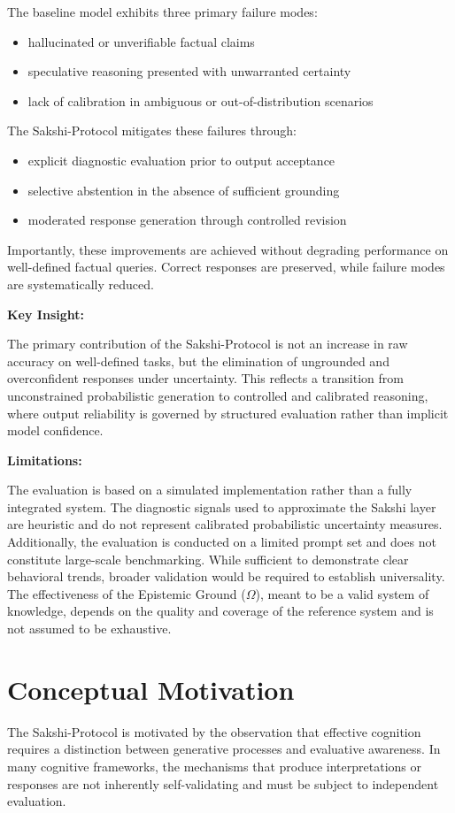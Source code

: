 \documentclass[12pt,a4paper]{article}
\begin{document}
The baseline model exhibits three primary failure modes:
\begin{itemize}
\item hallucinated or unverifiable factual claims
\item speculative reasoning presented with unwarranted certainty
\item lack of calibration in ambiguous or out-of-distribution scenarios
\end{itemize}

The Sakshi-Protocol mitigates these failures through:
\begin{itemize}
\item explicit diagnostic evaluation prior to output acceptance
\item selective abstention in the absence of sufficient grounding
\item moderated response generation through controlled revision
\end{itemize}

Importantly, these improvements are achieved without degrading performance on well-defined factual queries. Correct responses are preserved, while failure modes are systematically reduced.

\textbf{Key Insight:}

The primary contribution of the Sakshi-Protocol is not an increase in raw accuracy on well-defined tasks, but the elimination of ungrounded and overconfident responses under uncertainty. This reflects a transition from unconstrained probabilistic generation to controlled and calibrated reasoning, where output reliability is governed by structured evaluation rather than implicit model confidence.

\textbf{Limitations:}

The evaluation is based on a simulated implementation rather than a fully integrated system. The diagnostic signals used to approximate the Sakshi layer are heuristic and do not represent calibrated probabilistic uncertainty measures. Additionally, the evaluation is conducted on a limited prompt set and does not constitute large-scale benchmarking. While sufficient to demonstrate clear behavioral trends, broader validation would be required to establish universality. The effectiveness of the Epistemic Ground ($\Omega$), meant to be a valid system of knowledge, depends on the quality and coverage of the reference system and is not assumed to be exhaustive.

\section{Conceptual Motivation}
The Sakshi-Protocol is motivated by the observation that effective cognition requires a distinction between generative processes and evaluative awareness. In many cognitive frameworks, the mechanisms that produce interpretations or responses are not inherently self-validating and must be subject to independent evaluation.
\end{document}
